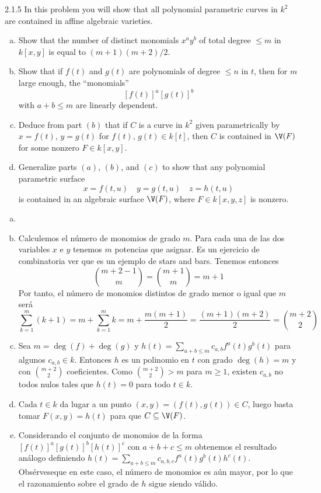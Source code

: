 \documentclass[twoside]{article}
\begin{document}
\begin{ejercicio}{2.1.5}
In this problem you will show that all polynomial parametric curves in $k^2$ are contained in affine algebraic varieties.
\begin{enumerate}[a.]
\item Show that the number of distinct monomials $x^ay^b$ of total degree $≤ m$ in $k[x, y]$ is equal
to $(m + 1)(m + 2)/2$.
\item Show that if $f (t)$ and $g(t)$ are polynomials of degree $≤ n$ in $t$, then for $m$ large enough,
the “monomials”
$$
[f(t)]^a[g(t)]^b
$$
with $a+b\leq m$ are linearly dependent.
\item Deduce from part $(b)$ that if $C$ is a curve in $k^2$ given parametrically by $x = f (t)$, $y = g(t)$ for $f (t)$, $g(t) ∈ k[t]$, then $C$ is contained in $\V(F)$ for some nonzero $F ∈ k[x, y]$.
\item Generalize parts $(a)$, $(b)$, and $(c)$ to show that any polynomial parametric surface
$$
x=f(t,u) \quad y = g(t,u) \quad z=h(t,u)
$$
is contained in an algebraic surface $\V(F)$, where $F ∈ k[x, y, z]$ is nonzero.
\end{enumerate}
\begin{solucion}
\begin{enumerate}[a.]
\item[]
\item Calculemos el número de monomios de grado $m$. Para cada una de las dos variables $x$ e $y$ tenemos $m$ potencias que asignar. Es un ejercicio de combinatoria ver que es un ejemplo de stars and bars. Tenemos entonces 
$$
\binom{m+2-1}{m} = \binom{m+1}{m} = m+1
$$
Por tanto, el número de monomios distintos de grado menor o igual que $m$ será
$$\sum_{k=1}^m (k+1)  = m + \sum_{k=1}^m k = m + \frac{m(m+1)}{2} = \frac{(m+1)(m+2)}{2} = \binom{m+2}{2}
$$

\item Sea $m=\deg(f)+\deg(g)$ y $h(t)=\sum_{a+b\leq m} c_{a,b}f^a(t)g^b(t)$ para algunos $c_{a,b}\in k$. Entonces $h$ es un polinomio en $t$ con grado $\deg(h)=m$ y con $\binom{m+2}{2}$ coeficientes. Como $\binom{m+2}{2}>m$ para $m\geq 1$, existen $c_{a,b}$ no todos nulos tales que $h(t)=0$ para todo $t\in k$.

\item Cada $t\in k$ da lugar a un punto $(x,y)=(f(t),g(t))\in C$, luego basta tomar $F(x,y)=h(t)$ para que $C\subseteq\V(F)$.

\item Considerando el conjunto de monomios de la forma $[f(t)]^a[g(t)]^b[h(t)]^c$ con $a+b+c\leq m$ obtenemos el resultado análogo definiendo $h(t)=\sum_{a+b\leq m} c_{a,b,c}f^a(t)g^b(t)h^c(t).$ Obsérveseque en este caso, el número de monomios es aún mayor, por lo que el razonamiento sobre el grado de $h$ sigue siendo válido.
\end{enumerate}
\end{solucion}
\end{ejercicio}
\end{document}

